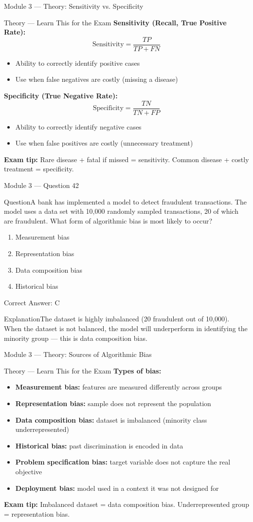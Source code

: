 \documentclass[aspectratio=169,10pt]{beamer}
\newcommand{\question}[1]{\begin{block}{Question}#1\end{block}}
\newcommand{\options}[4]{%
	\begin{enumerate}[label=\Alph*.,leftmargin=*]
		\item #1
		\item #2
		\item #3
		\item #4
	\end{enumerate}
}
\newcommand{\answerbox}[1]{\begin{exampleblock}{Correct Answer: #1}\end{exampleblock}}
\newcommand{\explain}[1]{\begin{block}{Explanation}#1\end{block}}
\newcommand{\theory}[1]{%
	\begin{block}{Theory --- Learn This for the Exam}
		\small #1
	\end{block}
}
\begin{document}
	\begin{frame}{Module 3 --- Theory: Sensitivity vs. Specificity}
		\theory{
			\textbf{Sensitivity (Recall, True Positive Rate):}
			\[
			\text{Sensitivity} = \frac{TP}{TP + FN}
			\]
			\begin{itemize}
				\item Ability to correctly identify positive cases
				\item Use when false negatives are costly (missing a disease)
			\end{itemize}
			\textbf{Specificity (True Negative Rate):}
			\[
			\text{Specificity} = \frac{TN}{TN + FP}
			\]
			\begin{itemize}
				\item Ability to correctly identify negative cases
				\item Use when false positives are costly (unnecessary treatment)
			\end{itemize}
			\textbf{Exam tip:} Rare disease + fatal if missed = sensitivity. Common disease + costly treatment = specificity.
		}
	\end{frame}
	
	\begin{frame}{Module 3 --- Question 42}
		\question{A bank has implemented a model to detect fraudulent transactions. The model uses a data set with 10,000 randomly sampled transactions, 20 of which are fraudulent. What form of algorithmic bias is most likely to occur?}
		\options{Measurement bias}{Representation bias}{Data composition bias}{Historical bias}
		\answerbox{C}
		\explain{The dataset is highly imbalanced (20 fraudulent out of 10,000). When the dataset is not balanced, the model will underperform in identifying the minority group --- this is data composition bias.}
	\end{frame}
	
	\begin{frame}{Module 3 --- Theory: Sources of Algorithmic Bias}
		\theory{
			\textbf{Types of bias:}
			\begin{itemize}
				\item \textbf{Measurement bias:} features are measured differently across groups
				\item \textbf{Representation bias:} sample does not represent the population
				\item \textbf{Data composition bias:} dataset is imbalanced (minority class underrepresented)
				\item \textbf{Historical bias:} past discrimination is encoded in data
				\item \textbf{Problem specification bias:} target variable does not capture the real objective
				\item \textbf{Deployment bias:} model used in a context it was not designed for
			\end{itemize}
			\textbf{Exam tip:} Imbalanced dataset = data composition bias. Underrepresented group = representation bias.
		}
	\end{frame}
	
\end{document}

